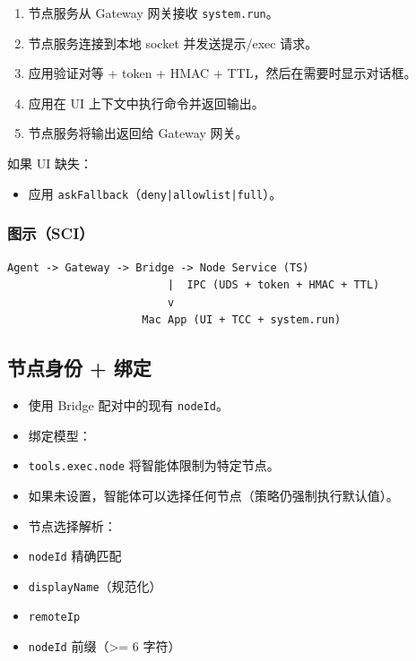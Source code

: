 \begin{enumerate}
  \item 节点服务从 Gateway 网关接收 \texttt{system.run}。
  \item 节点服务连接到本地 socket 并发送提示/exec 请求。
  \item 应用验证对等 + token + HMAC + TTL，然后在需要时显示对话框。
  \item 应用在 UI 上下文中执行命令并返回输出。
  \item 节点服务将输出返回给 Gateway 网关。
\end{enumerate}


如果 UI 缺失：

\begin{itemize}
  \item 应用 \texttt{askFallback}（\texttt{deny|allowlist|full}）。
\end{itemize}


\subsubsection{图示（SCI）}


\begin{lstlisting}
Agent -> Gateway -> Bridge -> Node Service (TS)
                         |  IPC (UDS + token + HMAC + TTL)
                         v
                     Mac App (UI + TCC + system.run)
\end{lstlisting}


\subsection{节点身份 + 绑定}


\begin{itemize}
  \item 使用 Bridge 配对中的现有 \texttt{nodeId}。
  \item 绑定模型：
  \item \texttt{tools.exec.node} 将智能体限制为特定节点。
  \item 如果未设置，智能体可以选择任何节点（策略仍强制执行默认值）。
  \item 节点选择解析：
  \item \texttt{nodeId} 精确匹配
  \item \texttt{displayName}（规范化）
  \item \texttt{remoteIp}
  \item \texttt{nodeId} 前缀（>= 6 字符）
\end{itemize}


